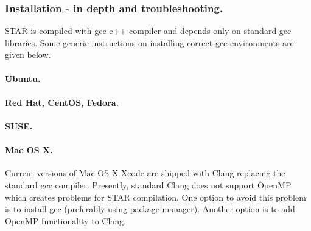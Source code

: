 \documentclass[12pt]{article}
\begin{document}
\subsubsection{Installation - in depth and troubleshooting.}
STAR is compiled with gcc c++ compiler and depends only on standard gcc libraries. Some generic instructions on installing correct gcc environments are given below.

\paragraph{Ubuntu.}\hfill
{}

\paragraph{Red Hat, CentOS, Fedora.}\hfill
{}
   
\paragraph{SUSE.}\hfill
{}

\paragraph{Mac OS X.\newline}
Current versions of Mac OS X Xcode are shipped with Clang replacing the standard gcc compiler. Presently, standard Clang does not support OpenMP which creates problems for STAR compilation. One option to avoid this problem is to install gcc (preferably using  package manager). Another option is to add OpenMP functionality to Clang.
\end{document}
